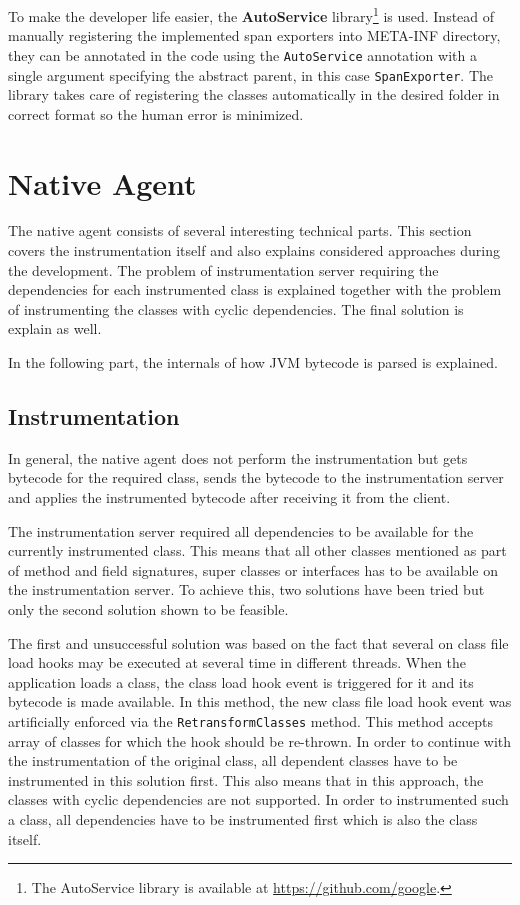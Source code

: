 To make the developer life easier, the \textbf{AutoService} library\footnote{The AutoService library is available at \url{https://github.com/google}.} is used. Instead of manually registering the implemented span exporters into META-INF directory, they can be annotated in the code using the \texttt{AutoService} annotation with a single argument specifying the abstract parent, in this case \texttt{SpanExporter}. The library takes care of registering the classes automatically in the desired folder in correct format so the human error is minimized.
\section{Native Agent}
The native agent consists of several interesting technical parts. This section covers the instrumentation itself and also explains considered approaches during the development. The problem of instrumentation server requiring the dependencies for each instrumented class is explained together with the problem of instrumenting the classes with cyclic dependencies. The final solution is explain as well. 

In the following part, the internals of how JVM bytecode is parsed is explained.
\subsection{Instrumentation}
In general, the native agent does not perform the instrumentation but gets bytecode for the required class, sends the bytecode to the instrumentation server and applies the instrumented bytecode after receiving it from the client. 

The instrumentation server required all dependencies to be available for the currently instrumented class. This means that all other classes mentioned as part of method and field signatures, super classes or interfaces has to be available on the instrumentation server. To achieve this, two solutions have been tried but only the second solution shown to be feasible.

The first and unsuccessful solution was based on the fact that several on class file load hooks may be executed at several time in different threads. When the application loads a class, the class load hook event is triggered for it and its bytecode is made available. In this method, the new class file load hook event was artificially enforced via the \texttt{RetransformClasses} method. This method accepts array of classes for which the hook should be re-thrown. In order to continue with the instrumentation of the original class, all dependent classes have to be instrumented in this solution first. This also means that in this approach, the classes with cyclic dependencies are not supported. In order to instrumented such a class, all dependencies have to be instrumented first which is also the class itself.

